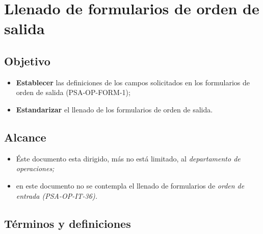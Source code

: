 \thispagestyle{formato-PI}
\renewcommand{\MayorVer}{1}
\renewcommand{\MenorVer}{0}
\renewcommand{\Codigo}{BPD-10-IT}
\renewcommand{\FechaPub}{2023--01}
\renewcommand{\Titulo}{Llenado de formularios de orden de salida}
\section{\Titulo}

\subsection{Objetivo}

\begin{itemize}
	\item \textbf{Establecer} las definiciones de los campos solicitados en los formularios de orden de salida (PSA-OP-FORM-1);
	\item \textbf{Estandarizar} el llenado de los formularios de orden de salida.
\end{itemize}

\subsection{Alcance}

\begin{itemize}
	\item Éste documento esta dirigido, más no está limitado, al \emph{departamento de operaciones;}
	\item en este documento no se contempla el llenado de formularios de \emph{orden de entrada (PSA-OP-IT-36).}
\end{itemize}

\subsection{Términos y definiciones}

